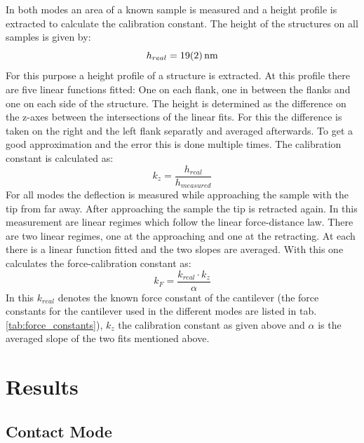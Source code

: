 \documentclass[%
 reprint,
amsmath,amssymb,
pra,
]{revtex4-1}
\begin{document}
In both modes an area of a known sample is measured and a height profile is extracted to calculate the calibration constant. The height of the structures on all samples is given by:
\begin{equation*}
h_{real} = \SI{19 \pm 2}{nm}
\end{equation*}
For this purpose a height profile of a structure is extracted. At this profile there are five linear functions fitted: One on each flank, one in between the flanks and one on each side of the structure. The height is determined as the difference on the z-axes between the intersections of the linear fits. For this the difference is taken on the right and the left flank separatly and averaged afterwards. To get a good approximation and the error this is done multiple times. The calibration constant is calculated as:
\begin{equation*}
k_z = \dfrac{h_{real}}{h_{measured}}
\end{equation*}
For all modes the deflection is measured while approaching the sample with the tip from far away. After approaching the sample the tip is retracted again. In this measurement are linear regimes which follow the linear force-distance law. There are two linear regimes, one at the approaching and one at the retracting. At each there is a linear function fitted and the two slopes are averaged. With this one calculates the force-calibration constant as:
\begin{equation*}
k_F = \dfrac{k_{real} \cdot k_z}{\alpha}
\end{equation*}
In this $k_{real}$ denotes the known force constant of the cantilever (the force constants for the cantilever used in the different modes are listed in tab. \ref{tab:force_constants}), $k_z$ the calibration constant as given above and $\alpha$ is the averaged slope of the two fits mentioned above. \\

\section{Results}
\label{sec:Results}
\subsection{Contact Mode}
\end{document}
